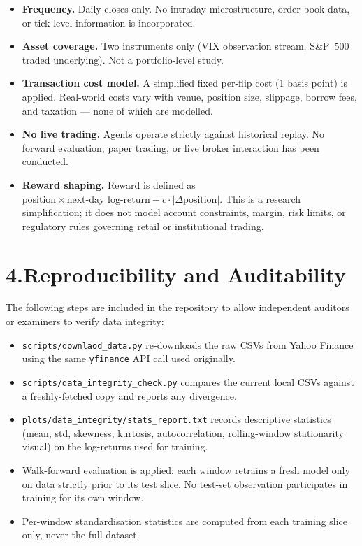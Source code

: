 \documentclass[11pt,a4paper]{article}
\begin{document}
\begin{itemize}
  \item \textbf{Frequency.} Daily closes only. No intraday microstructure,
    order-book data, or tick-level information is incorporated.
  \item \textbf{Asset coverage.} Two instruments only (VIX observation
    stream, S\&P~500 traded underlying). Not a portfolio-level study.
  \item \textbf{Transaction cost model.} A simplified fixed per-flip cost
    (1 basis point) is applied. Real-world costs vary with venue,
    position size, slippage, borrow fees, and taxation --- none of which
    are modelled.
  \item \textbf{No live trading.} Agents operate strictly against
    historical replay. No forward evaluation, paper trading, or live
    broker interaction has been conducted.
  \item \textbf{Reward shaping.} Reward is defined as
    $\text{position} \times \text{next-day log-return} - c \cdot
    |\Delta\text{position}|$. This is a research simplification; it does
    not model account constraints, margin, risk limits, or regulatory
    rules governing retail or institutional trading.
\end{itemize}

\section{4.\quad Reproducibility and Auditability}

The following steps are included in the repository to allow independent
auditors or examiners to verify data integrity:

\begin{itemize}
  \item \texttt{scripts/downlaod\_data.py} re-downloads the raw CSVs from
    Yahoo Finance using the same \texttt{yfinance} API call used
    originally.
  \item \texttt{scripts/data\_integrity\_check.py} compares the current
    local CSVs against a freshly-fetched copy and reports any divergence.
  \item \texttt{plots/data\_integrity/stats\_report.txt} records
    descriptive statistics (mean, std, skewness, kurtosis, autocorrelation,
    rolling-window stationarity visual) on the log-returns used for
    training.
  \item Walk-forward evaluation is applied: each window retrains a fresh
    model only on data strictly prior to its test slice. No test-set
    observation participates in training for its own window.
  \item Per-window standardisation statistics are computed from each
    training slice only, never the full dataset.
\end{itemize}
\end{document}
